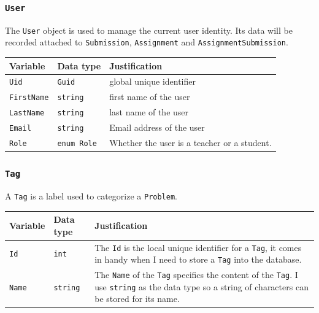 \documentclass[a4paper]{report}
\begin{document}
\subsubsection{\texttt{User}}

The \texttt{User} object is used to manage the current user identity. Its data will be recorded attached to \texttt{Submission}, \texttt{Assignment} and \texttt{AssignmentSubmission}.

\begin{tabulary}{\textwidth}{|l|l|L|}
    \hline
    Variable & Data type & Justification \\
    \hline
    \texttt{Uid} & \texttt{Guid} & global unique identifier \\
    \hline
    \texttt{FirstName} & \texttt{string} & first name of the user \\
    \hline
    \texttt{LastName} & \texttt{string} & last name of the user \\
    \hline
    \texttt{Email} & \texttt{string} & Email address of the user \\
    \hline
    \texttt{Role} & \texttt{enum Role} & Whether the user is a teacher or a student. \\
    \hline
\end{tabulary}

\subsubsection{\texttt{Tag}}

A \texttt{Tag} is a label used to categorize a \texttt{Problem}.

\begin{tabulary}{\textwidth}{|l|l|L|}
    \hline
    Variable & Data type & Justification \\
    \hline
    \texttt{Id} & \texttt{int} & The \texttt{Id} is the local unique identifier for a \texttt{Tag}, it comes in handy when I need to store a \texttt{Tag} into the database. \\
    \hline
    \texttt{Name} & \texttt{string} & The \texttt{Name} of the \texttt{Tag} specifics the content of the \texttt{Tag}. I use \texttt{string} as the data type so a string of characters can be stored for its name. \\
    \hline
\end{tabulary}
\end{document}
